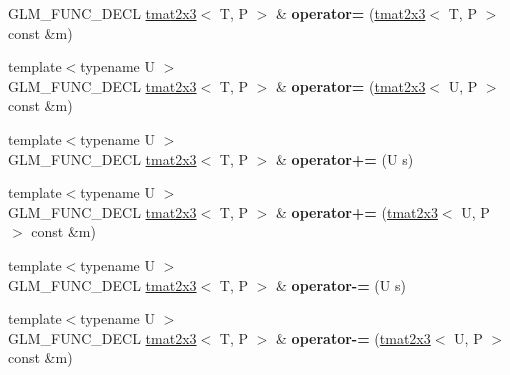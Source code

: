 \begin{DoxyCompactItemize}
\item 
\hypertarget{structglm_1_1detail_1_1tmat2x3_aa725ba154586ee1bfea787036c82bc4a}{G\-L\-M\-\_\-\-F\-U\-N\-C\-\_\-\-D\-E\-C\-L \hyperlink{structglm_1_1detail_1_1tmat2x3}{tmat2x3}$<$ T, P $>$ \& {\bfseries operator=} (\hyperlink{structglm_1_1detail_1_1tmat2x3}{tmat2x3}$<$ T, P $>$ const \&m)}\label{structglm_1_1detail_1_1tmat2x3_aa725ba154586ee1bfea787036c82bc4a}

\item 
\hypertarget{structglm_1_1detail_1_1tmat2x3_a449f7c79e1c6333dbc508656a698b4d9}{{\footnotesize template$<$typename U $>$ }\\G\-L\-M\-\_\-\-F\-U\-N\-C\-\_\-\-D\-E\-C\-L \hyperlink{structglm_1_1detail_1_1tmat2x3}{tmat2x3}$<$ T, P $>$ \& {\bfseries operator=} (\hyperlink{structglm_1_1detail_1_1tmat2x3}{tmat2x3}$<$ U, P $>$ const \&m)}\label{structglm_1_1detail_1_1tmat2x3_a449f7c79e1c6333dbc508656a698b4d9}

\item 
\hypertarget{structglm_1_1detail_1_1tmat2x3_ae08c795a556293db526b65227c559f43}{{\footnotesize template$<$typename U $>$ }\\G\-L\-M\-\_\-\-F\-U\-N\-C\-\_\-\-D\-E\-C\-L \hyperlink{structglm_1_1detail_1_1tmat2x3}{tmat2x3}$<$ T, P $>$ \& {\bfseries operator+=} (U s)}\label{structglm_1_1detail_1_1tmat2x3_ae08c795a556293db526b65227c559f43}

\item 
\hypertarget{structglm_1_1detail_1_1tmat2x3_a1e667eb8ffefc6bb508032e842349bfa}{{\footnotesize template$<$typename U $>$ }\\G\-L\-M\-\_\-\-F\-U\-N\-C\-\_\-\-D\-E\-C\-L \hyperlink{structglm_1_1detail_1_1tmat2x3}{tmat2x3}$<$ T, P $>$ \& {\bfseries operator+=} (\hyperlink{structglm_1_1detail_1_1tmat2x3}{tmat2x3}$<$ U, P $>$ const \&m)}\label{structglm_1_1detail_1_1tmat2x3_a1e667eb8ffefc6bb508032e842349bfa}

\item 
\hypertarget{structglm_1_1detail_1_1tmat2x3_a3c7e03eba709ac58d92499de92386ffa}{{\footnotesize template$<$typename U $>$ }\\G\-L\-M\-\_\-\-F\-U\-N\-C\-\_\-\-D\-E\-C\-L \hyperlink{structglm_1_1detail_1_1tmat2x3}{tmat2x3}$<$ T, P $>$ \& {\bfseries operator-\/=} (U s)}\label{structglm_1_1detail_1_1tmat2x3_a3c7e03eba709ac58d92499de92386ffa}

\item 
\hypertarget{structglm_1_1detail_1_1tmat2x3_a5544985401df4e7457e9aa7925ad0ca5}{{\footnotesize template$<$typename U $>$ }\\G\-L\-M\-\_\-\-F\-U\-N\-C\-\_\-\-D\-E\-C\-L \hyperlink{structglm_1_1detail_1_1tmat2x3}{tmat2x3}$<$ T, P $>$ \& {\bfseries operator-\/=} (\hyperlink{structglm_1_1detail_1_1tmat2x3}{tmat2x3}$<$ U, P $>$ const \&m)}\label{structglm_1_1detail_1_1tmat2x3_a5544985401df4e7457e9aa7925ad0ca5}


\end{DoxyCompactItemize}
